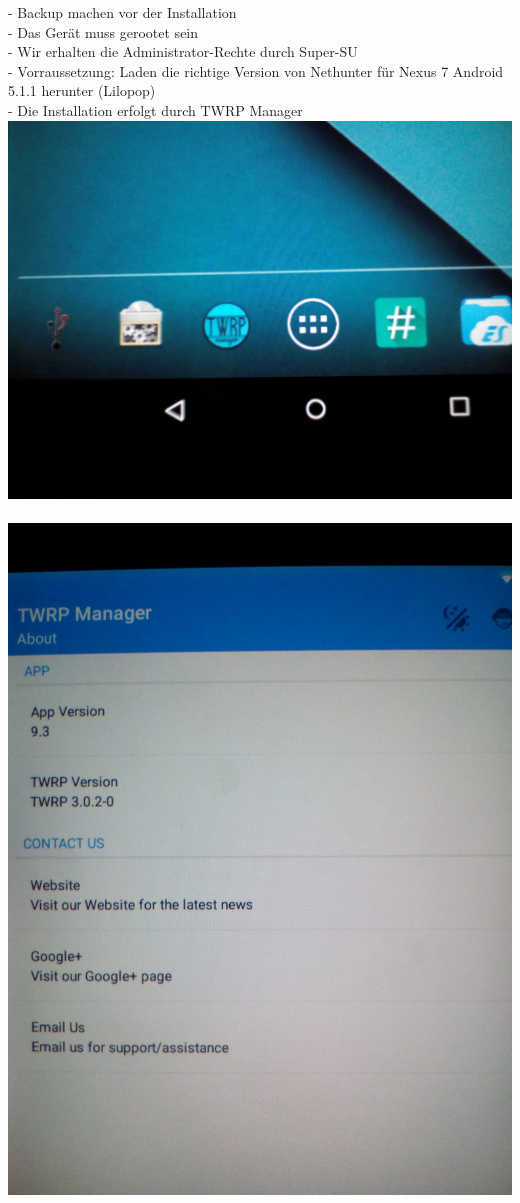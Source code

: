\documentclass[11pt,a4paper]{article}
\begin{document}
- Backup machen vor der Installation \\  
- Das Gerät muss gerootet sein \\
- Wir erhalten die Administrator-Rechte durch Super-SU \\
- Vorraussetzung: Laden die richtige Version von Nethunter für Nexus 7 Android 5.1.1 herunter (Lilopop) \\
- Die Installation erfolgt durch TWRP Manager \\ 
\includegraphics[scale=0.09]{./Image/img9} \\ \\ 
\includegraphics[scale=0.09]{./Image/img10} \\ \\
\end{document}
